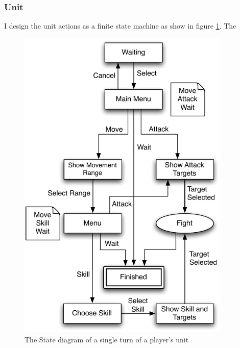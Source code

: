 \clearpage
\subsubsection{Unit}
\label{ssub:unit}
I design the unit actions as a finite state machine as show in figure \ref{fig:figures_unit}.  The 

\begin{figure}[h]
	\centering
		\includegraphics[width=4in]{figures/unit.pdf}
	\caption{The State diagram of a single turn of a player's unit}
	\label{fig:figures_unit}
\end{figure}

